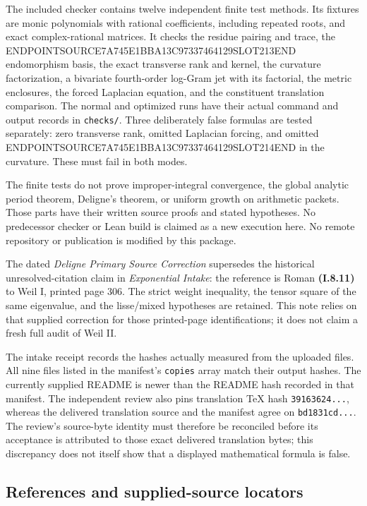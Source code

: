The included checker contains twelve independent finite test methods. Its fixtures are monic polynomials with rational coefficients, including repeated roots, and exact complex-rational matrices. It checks the residue pairing and trace, the ENDPOINTSOURCE7A745E1BBA13C97337464129SLOT213END endomorphism basis, the exact transverse rank and kernel, the curvature factorization, a bivariate fourth-order log-Gram jet with its factorial, the metric enclosures, the forced Laplacian equation, and the constituent translation comparison. The normal and optimized runs have their actual command and output records in \texttt{checks/}. Three deliberately false formulas are tested separately: zero transverse rank, omitted Laplacian forcing, and omitted ENDPOINTSOURCE7A745E1BBA13C97337464129SLOT214END in the curvature. These must fail in both modes.

The finite tests do not prove improper-integral convergence, the global analytic period theorem, Deligne's theorem, or uniform growth on arithmetic packets. Those parts have their written source proofs and stated hypotheses. No predecessor checker or Lean build is claimed as a new execution here. No remote repository or publication is modified by this package.

The dated \emph{Deligne Primary Source Correction} supersedes the historical unresolved-citation claim in \emph{Exponential Intake}: the reference is Roman \textbf{(I.8.11)} to Weil I, printed page 306. The strict weight inequality, the tensor square of the same eigenvalue, and the lisse/mixed hypotheses are retained. This note relies on that supplied correction for those printed-page identifications; it does not claim a fresh full audit of Weil II.

The intake receipt records the hashes actually measured from the uploaded files. All nine files listed in the manifest's \texttt{copies} array match their output hashes. The currently supplied README is newer than the README hash recorded in that manifest. The independent review also pins translation TeX hash \texttt{39163624...}, whereas the delivered translation source and the manifest agree on \texttt{bd1831cd...}. The review's source-byte identity must therefore be reconciled before its acceptance is attributed to those exact delivered translation bytes; this discrepancy does not itself show that a displayed mathematical formula is false.

\subsection{References and supplied-source locators}\label{endpoint-residue_original--references-and-supplied-source-locators}

